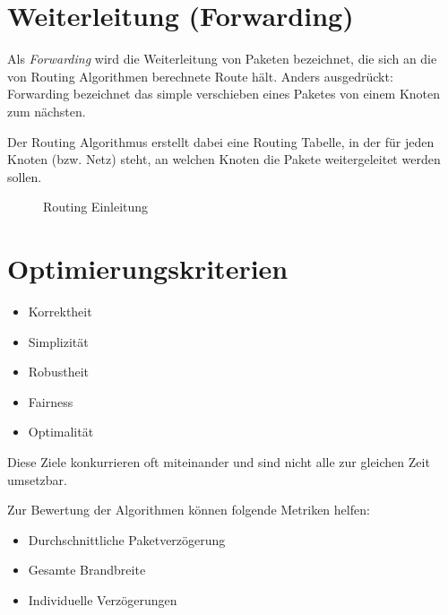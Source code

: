 	\section{Weiterleitung (Forwarding)}
		Als \textit{Forwarding} wird die Weiterleitung von Paketen bezeichnet, die sich an die von Routing Algorithmen berechnete Route hält. Anders ausgedrückt: Forwarding bezeichnet das simple verschieben eines Paketes von einem Knoten zum nächsten.

		Der Routing Algorithmus erstellt dabei eine Routing Tabelle, in der für jeden Knoten (bzw. Netz) steht, an welchen Knoten die Pakete weitergeleitet werden sollen.

		\begin{figure}[H]
			\centering
			\caption{Routing Einleitung}
		\end{figure}

	\section{Optimierungskriterien}
		\begin{itemize}
			\item Korrektheit
			\item Simplizität
			\item Robustheit
			\item Fairness
			\item Optimalität
		\end{itemize}

		Diese Ziele konkurrieren oft miteinander und sind nicht alle zur gleichen Zeit umsetzbar.

		Zur Bewertung der Algorithmen können folgende Metriken helfen:
		\begin{itemize}
			\item Durchschnittliche Paketverzögerung
			\item Gesamte Brandbreite
			\item Individuelle Verzögerungen
		\end{itemize}

